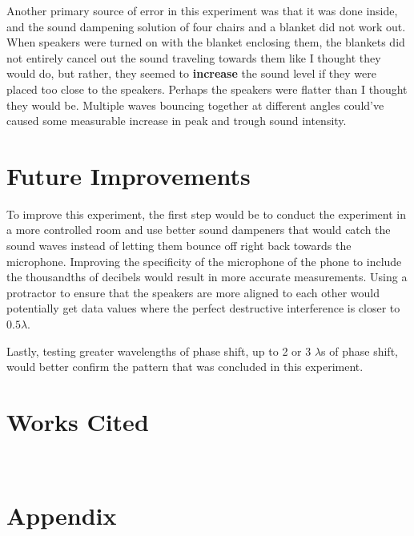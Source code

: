 \documentclass[index]{subfiles}
\begin{document}
Another primary source of error in this experiment was that it was done inside, and the sound dampening solution of four chairs and a blanket did not work out. When speakers were turned on with the blanket enclosing them, the blankets did not entirely cancel out the sound traveling towards them like I thought they would do, but rather, they seemed to \textbf{increase} the sound level if they were placed too close to the speakers. Perhaps the speakers were flatter than I thought they would be. Multiple waves bouncing together at different angles could've caused some measurable increase in peak and trough sound intensity.


\section{Future Improvements}

To improve this experiment, the first step would be to conduct the experiment in a more controlled room and use better sound dampeners that would catch the sound waves instead of letting them bounce off right back towards the microphone. Improving the specificity of the microphone of the phone to include the thousandths of decibels would result in more accurate measurements. Using a protractor to ensure that the speakers are more aligned to each other would potentially get data values where the perfect destructive interference is closer to \(0.5\lambda\).

Lastly, testing greater wavelengths of phase shift, up to 2 or 3 \(\lambda\)s of phase shift, would better confirm the pattern that was concluded in this experiment.

\section{Works Cited}

\printbibliography\

\section{Appendix}
\end{document}
